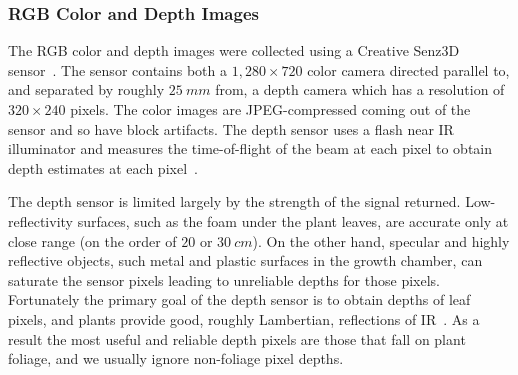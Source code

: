 \subsubsection{RGB Color and Depth Images} %
The RGB color and depth images were collected using a Creative Senz3D sensor~\cite{nguyen2015vietnamese}.
The sensor contains both a $1,280 \times 720$ color camera directed parallel to, and separated by roughly $25~mm$ from, a depth camera which has a resolution of $320\times240$ pixels.  The color images are JPEG-compressed coming out of the sensor and so have block artifacts.  The depth sensor uses a flash near IR illuminator and measures the time-of-flight of the beam at each pixel to obtain depth estimates at each pixel~\cite{Hansard2013}.

The depth sensor is limited largely by the strength of the signal returned.  Low-reflectivity surfaces, such as the foam under the plant leaves, are accurate only at close range (on the order of $20$ or $30~cm$).  On the other hand, specular and highly reflective objects, such metal and plastic surfaces in the growth chamber, can saturate the sensor pixels leading to unreliable depths for those pixels.  Fortunately the primary goal of the depth sensor is to obtain depths of leaf pixels, and plants provide good, roughly Lambertian, reflections of IR~\cite{Chelle2006219}.  As a result the most useful and reliable depth pixels are those that fall on plant foliage, and we usually ignore non-foliage pixel depths.

